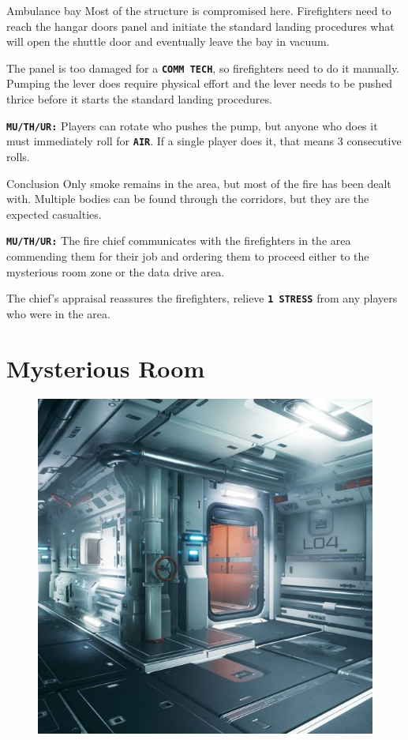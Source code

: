 \newsect


\begin{rpg-commentbox}{Ambulance bay}
    Most of the structure is compromised here. Firefighters need to reach the hangar doors panel and initiate the standard landing procedures what will open the shuttle door and eventually leave the bay in vacuum. 

    The panel is too damaged for a \texttt{\textbf{COMM TECH}}, so firefighters need to do it manually. Pumping the lever does require  physical effort and the lever needs to be pushed thrice before it starts the standard landing procedures. 

    \texttt{\textbf{MU/TH/UR:}} Players can rotate who pushes the pump, but anyone who does it must immediately roll for \texttt{\textbf{AIR}}. If a single player does it, that means 3 consecutive rolls.
\end{rpg-commentbox}  

\newsect


\begin{rpg-commentbox}{Conclusion}
    Only smoke remains in the area, but most of the fire has been dealt with. Multiple bodies can be found through the corridors, but they are the expected casualties.
    
    \texttt{\textbf{MU/TH/UR:}} The fire chief communicates with the firefighters in the area commending them for their job  and ordering them to proceed either to the mysterious room zone or the data drive area. 

    The chief's appraisal reassures the firefighters, relieve \texttt{\textbf{1 STRESS}} from any players who were in the area.
\end{rpg-commentbox}  



\clearpage

\section{Mysterious Room}



\begin{figure}
    \centering
    \includegraphics[width=.4\textwidth]{img/bg/corridor.jpg}
\end{figure}


